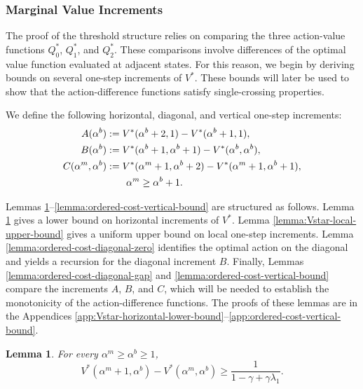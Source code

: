 \documentclass[letterpaper,journal]{IEEEtran}
\newtheorem{lemma}{Lemma}
\begin{document}
\subsubsection{Marginal Value Increments}
The proof of the threshold structure relies on comparing the three action-value functions $Q_0^*$, $Q_1^*$, and $Q_2^*$. These comparisons involve differences of the optimal value function evaluated at adjacent states. For this reason, we begin by deriving bounds on several one-step increments of $V^*$. These bounds will later be used to show that the action-difference functions satisfy single-crossing properties.

We define the following horizontal, diagonal, and vertical one-step increments:
\begin{align}
A(\alpha^b) 
&:= V^*(\alpha^b+2,1)-V^*(\alpha^b+1,1),\\
B(\alpha^b) 
&:= V^*(\alpha^b+1,\alpha^b+1)-V^*(\alpha^b,\alpha^b),\\
C(\alpha^m,\alpha^b) 
&:= V^*(\alpha^m+1,\alpha^b+2)-V^*(\alpha^m+1,\alpha^b+1),\notag\\
&\hspace{2em}\alpha^m\geq \alpha^b+1.
\end{align}

Lemmas \ref{lemma:Vstar-horizontal-lower-bound}--\ref{lemma:ordered-cost-vertical-bound} are structured as follows. Lemma \ref{lemma:Vstar-horizontal-lower-bound} gives a lower bound on horizontal increments of $V^*$. Lemma \ref{lemma:Vstar-local-upper-bound} gives a uniform upper bound on local one-step increments. Lemma \ref{lemma:ordered-cost-diagonal-zero} identifies the optimal action on the diagonal and yields a recursion for the diagonal increment $B$. Finally, Lemmas \ref{lemma:ordered-cost-diagonal-gap} and \ref{lemma:ordered-cost-vertical-bound} compare the increments $A$, $B$, and $C$, which will be needed to establish the monotonicity of the action-difference functions. The proofs of these lemmas are in the Appendices \ref{app:Vstar-horizontal-lower-bound}--\ref{app:ordered-cost-vertical-bound}.

\begin{lemma}\label{lemma:Vstar-horizontal-lower-bound}
For every $\alpha^m\geq \alpha^b\ge 1$,
\begin{equation}\label{eq:Vstar-horizontal-lower-bound}
V^*(\alpha^m+1,\alpha^b)-V^*(\alpha^m,\alpha^b)\geq \frac{1}{1-\gamma+\gamma\lambda_1}.
\end{equation}
\end{lemma}
\end{document}
